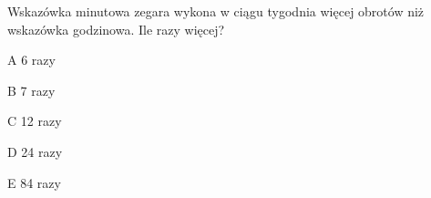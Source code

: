 \begin{tresc}
Wskazówka minutowa zegara wykona w ciągu tygodnia więcej obrotów niż wskazówka godzinowa. Ile razy więcej?
\end{tresc}
\begin{wariant}{A} 6 razy \end{wariant}
\begin{wariant}{B} 7 razy \end{wariant}
\begin{wariant}{C} 12 razy \end{wariant}
\begin{wariant}{D} 24 razy \end{wariant}
\begin{wariant}{E} 84 razy \end{wariant}

